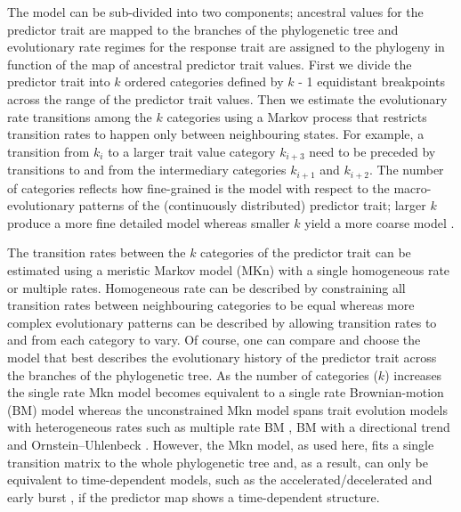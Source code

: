 The model can be sub-divided into two components; ancestral values for the predictor trait are mapped to the branches of the phylogenetic tree and evolutionary rate regimes for the response trait are assigned to the phylogeny in function of the map of ancestral predictor trait values. First we divide the predictor trait into $\mathit{k}$ ordered categories defined by $\mathit{k}$ - 1 equidistant breakpoints across the range of the predictor trait values. Then we estimate the evolutionary rate transitions among the $\mathit{k}$ categories using a Markov process \citep{pagel_detecting_1994} that restricts transition rates to happen only between neighbouring states. For example, a transition from $\mathit{k_{i}}$ to a larger trait value category $\mathit{k_{i+3}}$ need to be preceded by transitions to and from the intermediary categories $\mathit{k_{i+1}}$ and $\mathit{k_{i+2}}$. The number of categories reflects how fine-grained is the model with respect to the macro-evolutionary patterns of the (continuously distributed) predictor trait; larger $\mathit{k}$ produce a more fine detailed model whereas smaller $\mathit{k}$ yield a more coarse model \citep{boucher_inferring_2016}.

The transition rates between the $\mathit{k}$ categories of the predictor trait can be estimated using a meristic Markov model (MKn) with a single homogeneous rate or multiple rates. Homogeneous rate can be described by constraining all transition rates between neighbouring categories to be equal whereas more complex evolutionary patterns can be described by allowing transition rates to and from each category to vary. Of course, one can compare and choose the model that best describes the evolutionary history of the predictor trait across the branches of the phylogenetic tree. As the number of categories ($\mathit{k}$) increases the single rate Mkn model becomes equivalent to a single rate Brownian-motion (BM) model whereas the unconstrained Mkn model spans trait evolution models with heterogeneous rates such as multiple rate BM \citep{omeara_testing_2006}, BM with a directional trend \citep{hunt_fitting_2006} and Ornstein–Uhlenbeck \citep[OU --][]{butler_phylogenetic_2004} \citep{boucher_inferring_2016}. However, the Mkn model, as used here, fits a single transition matrix to the whole phylogenetic tree and, as a result, can only be equivalent to time-dependent models, such as the accelerated/decelerated \citep[ACDC --][]{blomberg_testing_2003, uyeda_comparative_2015} and early burst \citep[EB --][]{harmon_early_2010}, if the predictor map shows a time-dependent structure.

